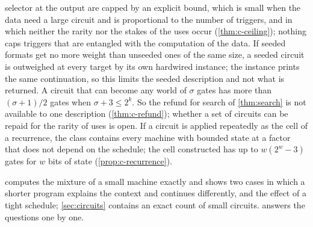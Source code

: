 \begin{enumerate}[leftmargin=1.6em,itemsep=2pt,topsep=3pt]
selector at the output are capped by an explicit bound, which is small when the data need a large circuit
and is proportional to the number of triggers, and in which neither the rarity nor the stakes of the uses
occur (\cref{thm:c-ceiling}); nothing caps
triggers that are entangled with the computation of the data. If seeded formats get no more weight than
unseeded ones of the same size, a seeded circuit is outweighed at every target by its own hardwired
instance; the instance prints the same continuation, so this limits the seeded description and not what is
returned. A circuit that can become any world of $\sigma$ gates has more than $(\sigma+1)/2$ gates when
$\sigma+3\le2^k$. So the refund for search of \cref{thm:search} is not available to one description
(\cref{thm:c-refund}); whether a set of circuits can be repaid for the rarity of uses is open. If a circuit
is applied repeatedly as the cell of a recurrence, the class contains every machine with bounded state at a
factor that does not depend on the schedule; the cell constructed has up to $w(2^w-3)$ gates for $w$ bits of
state (\cref{prop:c-recurrence}).
\end{enumerate}
 computes the mixture of a small machine exactly and shows two cases in which a shorter
program explains the context and continues differently, and the effect of a tight schedule;
\cref{sec:circuits} contains an exact count of small circuits.  answers the questions one
by one.

